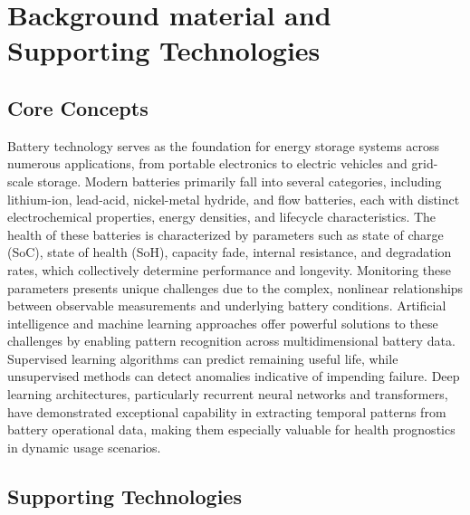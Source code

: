 


\chapter{Background material and Supporting Technologies}
\label{ch:background}
\lipsum[1]
\section{Core Concepts}

Battery technology serves as the foundation for energy storage systems across numerous applications, from portable electronics to electric vehicles and grid-scale storage. Modern batteries primarily fall into several categories, including lithium-ion, lead-acid, nickel-metal hydride, and flow batteries, each with distinct electrochemical properties, energy densities, and lifecycle characteristics. The health of these batteries is characterized by parameters such as state of charge (SoC), state of health (SoH), capacity fade, internal resistance, and degradation rates, which collectively determine performance and longevity. Monitoring these parameters presents unique challenges due to the complex, nonlinear relationships between observable measurements and underlying battery conditions. Artificial intelligence and machine learning approaches offer powerful solutions to these challenges by enabling pattern recognition across multidimensional battery data. Supervised learning algorithms can predict remaining useful life, while unsupervised methods can detect anomalies indicative of impending failure. Deep learning architectures, particularly recurrent neural networks and transformers, have demonstrated exceptional capability in extracting temporal patterns from battery operational data, making them especially valuable for health prognostics in dynamic usage scenarios.


\section{Supporting Technologies}


